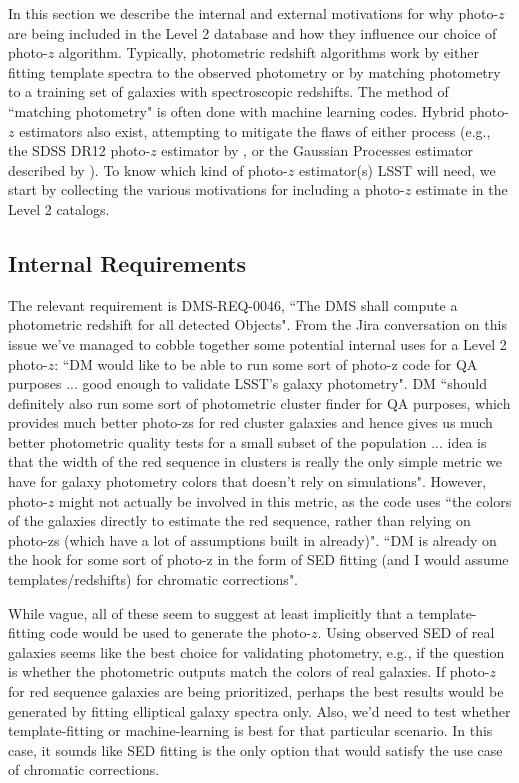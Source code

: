 \documentclass[DM,lsstdraft,toc]{lsstdoc}
\begin{document}
In this section we describe the internal and external motivations for why photo-$z$ are being included in the Level 2 database and how they influence our choice of photo-$z$ algorithm. Typically, photometric redshift algorithms work by either fitting template spectra to the observed photometry or by matching photometry to a training set of galaxies with spectroscopic redshifts. The method of ``matching photometry" is often done with machine learning codes. Hybrid photo-$z$ estimators also exist, attempting to mitigate the flaws of either process (e.g., the SDSS DR12 photo-$z$ estimator by \citealt{2016MNRAS.460.1371B}, or the Gaussian Processes estimator described by \citealt{2016arXiv161200847L}). To know which kind of photo-$z$ estimator(s) LSST will need, we start by collecting the various motivations for including a photo-$z$ estimate in the Level 2 catalogs.

\subsection{Internal Requirements}\label{ssec:motivation_internal}

The relevant requirement is DMS-REQ-0046, ``The DMS shall compute a photometric redshift for all detected Objects". From the Jira conversation on this issue we've managed to cobble together some potential internal uses for a Level 2 photo-$z$:
 ``DM would like to be able to run some sort of photo-z code for QA purposes ... good enough to validate LSST's galaxy photometry".
 DM ``should definitely also run some sort of photometric cluster finder for QA purposes, which provides much better photo-zs for red cluster galaxies and hence gives us much better photometric quality tests for a small subset of the population ... idea is that the width of the red sequence in clusters is really the only simple metric we have for galaxy photometry colors that doesn't rely on simulations". However, photo-$z$ might not actually be involved in this metric, as the code uses ``the colors of the galaxies directly to estimate the red sequence, rather than relying on photo-zs (which have a lot of assumptions built in already)".
 ``DM is already on the hook for some sort of photo-z in the form of SED fitting (and I would assume templates/redshifts) for chromatic corrections".

While vague, all of these seem to suggest at least implicitly that a template-fitting code would be used to generate the photo-$z$.
 Using observed SED of real galaxies seems like the best choice for validating photometry, e.g., if the question is whether the photometric outputs match the colors of real galaxies.
 If photo-$z$ for red sequence galaxies are being prioritized, perhaps the best results would be generated by fitting elliptical galaxy spectra only. Also, we'd need to test whether template-fitting or machine-learning is best for that particular scenario.
 In this case, it sounds like SED fitting is the only option that would satisfy the use case of chromatic corrections.
\end{document}
